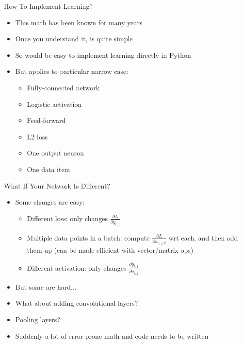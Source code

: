 \documentclass[aspectratio=169]{beamer}
\begin{document}
\begin{frame}{How To Implement Learning?}
\begin{itemize}
	\item This math has been known for many years
	\item Once you understand it, is quite simple
	\item So would be easy to implement learning directly in Python
	\item But applies to particular narrow case:
		\begin{itemize}
		\item Fully-connected network
		\item Logistic activation
		\item Feed-forward
		\item L2 loss
		\item One output neuron
		\item One data item
		\end{itemize}
\end{itemize}
\end{frame}

\begin{frame}{What If Your Network Is Different?}

\begin{itemize}
	\item Some changes are easy:
	\begin{itemize}
		\item Different loss: only changes $\frac{\partial L}{\partial y_{t,1}}$
		\item Multiple data points in a batch: 
			compute $\frac{\partial L}{\partial w_{i,j,k}}$ wrt each, and
			then add them up (can be made efficient with vector/matrix ops)
		\item Different activation: only changes $\frac{\partial y_{i,j}}{\partial v_{i,j}}$
	\end{itemize}
	\item But some are hard...
	\item What about adding convolutional layers?
	\item Pooling layers?
	\item Suddenly a lot of error-prone math and code needs to be written
\end{itemize}
\end{frame}
\end{document}
